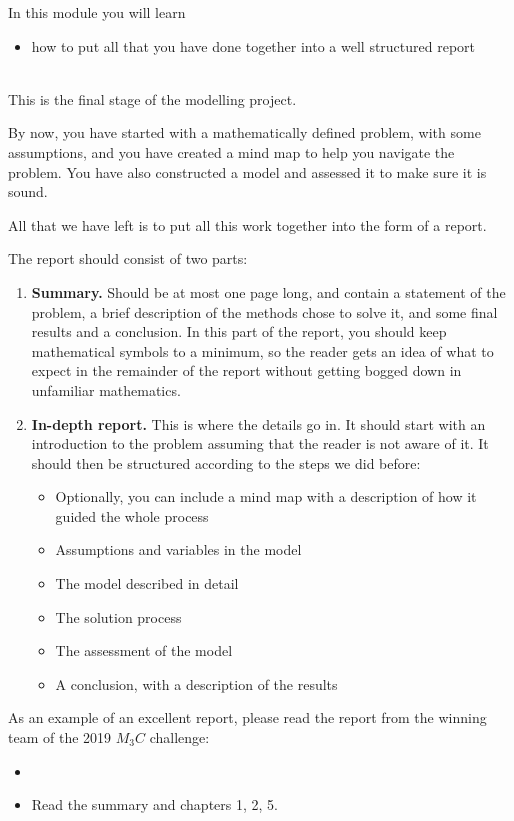 \begin{siam}
In this module you will learn
\begin{itemize}
	\item how to put all that you have done together into a well structured report
\end{itemize}

\hfill \\



This is the final stage of the modelling project.

By now, you have started with a mathematically defined problem, with some assumptions, and you have created a mind map to help you navigate the problem.
You have also constructed a model and assessed it to make sure it is sound.

All that we have left is to put all this work together into the form of a report.



The report should consist of two parts:

\begin{enumerate}
	\item \textbf{Summary. } Should be at most one page long, and contain a statement of the problem, a brief description of the methods chose to solve it, and some final results and a conclusion. In this part of the report, you should keep mathematical symbols to a minimum, so the reader gets an idea of what to expect in the remainder of the report without getting bogged down in unfamiliar mathematics.

	\item \textbf{In-depth report. } This is where the details go in. It should start with an introduction to the problem assuming that the reader is not aware of it. It should then be structured according to the steps we did before:
	\begin{itemize}
		\item Optionally, you can include a mind map with a description of how it guided the whole process
		\item Assumptions and variables in the model
		\item The model described in detail
		\item The solution process
		\item The assessment of the model
		\item A conclusion, with a description of the results
	\end{itemize}
\end{enumerate}





\begin{example}
As an example of an excellent report, please read the report from the winning team of the 2019 $M_3C$ challenge:
\begin{itemize}
	\item {}
	\item Read the summary and chapters 1, 2, 5.
\end{itemize}
\end{example}

\end{siam}


